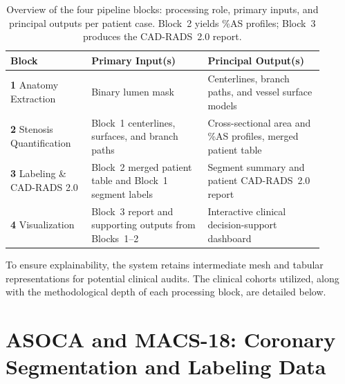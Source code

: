 \begin{table}[H]
  \centering
  \caption{Overview of the four pipeline blocks: processing role, primary inputs, and principal outputs per patient case. Block~2 yields \%AS profiles; Block~3 produces the CAD-RADS~2.0 report.}
  \label{tab:pipeline-blocks-overview}
  \vspace{0.65em}
  \small
  \renewcommand{\arraystretch}{1.4}
  \setlength{\tabcolsep}{8pt}
  \begin{tabular}{@{}>{\raggedright\arraybackslash}p{0.23\linewidth}>{\raggedright\arraybackslash}p{0.335\linewidth}>{\raggedright\arraybackslash}p{0.335\linewidth}@{}}
    \toprule
    \cellcolor{gray!12}\textbf{Block} &
    \cellcolor{gray!12}\textbf{Primary Input(s)} &
    \cellcolor{gray!12}\textbf{Principal Output(s)} \\
    \midrule
    \textbf{1} Anatomy Extraction &
    Binary lumen mask &
    Centerlines, branch paths, and vessel surface models \\
    \midrule
    \textbf{2} Stenosis Quantification &
    Block~1 centerlines, surfaces, and branch paths &
    Cross-sectional area and \%AS profiles, merged patient table \\
    \midrule
    \textbf{3} Labeling \& CAD-RADS 2.0 &
    Block~2 merged patient table and Block~1 segment labels &
    Segment summary and patient CAD-RADS~2.0 report \\
    \midrule
    \textbf{4} Visualization &
    Block~3 report and supporting outputs from Blocks~1--2 &
    Interactive clinical decision-support dashboard \\
    \bottomrule
  \end{tabular}
\end{table}

To ensure explainability, the system retains intermediate mesh and tabular representations for potential clinical audits. The clinical cohorts utilized, along with the methodological depth of each processing block, are detailed below.

\section{ASOCA and MACS-18: Coronary Segmentation and Labeling Data}
\label{sec:methodology-datasets}

